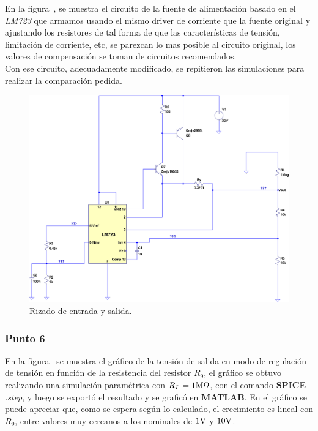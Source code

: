 \vspace{1.5cm}

En la figura~, se muestra el circuito de la fuente de alimentación basado en el \textit{LM723} que armamos usando el mismo driver de corriente que la fuente original y ajustando los resistores de tal forma de que las características de tensión, limitación de corriente, etc, se parezcan lo mas posible al circuito original, los valores de compensación se toman de circuitos recomendados.\\
Con ese circuito, adecuadamente modificado, se repitieron las simulaciones para realizar la comparación pedida.\\

\vfill


\clearpage

\begin{figure}[H] %
\begin{center}
\includegraphics[width=1.2 \textwidth, angle=90]{./img/preguntas/p21.png}
\caption{\label{fig:fig_p21}\footnotesize{Rizado de entrada y salida.}}
\end{center}
\end{figure}

\clearpage

\subsubsection{Punto 6}


En la figura~ se muestra el gráfico de la tensión de salida en modo de regulación de tensión en función de la resistencia del resistor $R_{9}$, el gráfico se obtuvo realizando una simulación paramétrica con $R_{L} = 1 \si[per-mode=symbol]{\mega\ohm}$, con el comando \textbf{SPICE} \textit{.step}, y luego se exportó el resultado y se graficó en \textbf{MATLAB}. En el gráfico se puede apreciar que, como se espera según lo calculado, el crecimiento es lineal con $R_{9}$, entre valores muy cercanos a los nominales de $1 \si[per-mode=symbol]{\volt}$ y $10 \si[per-mode=symbol]{\volt}$.




